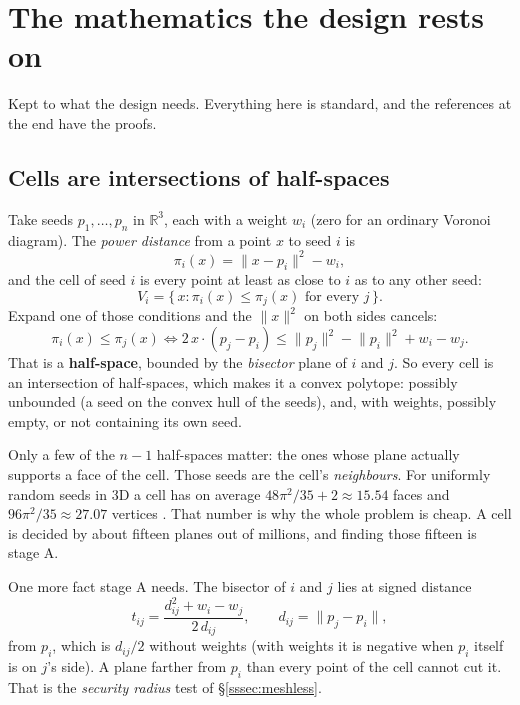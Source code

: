 \documentclass[11pt,a4paper]{article}
\newcommand{\R}{\mathbb{R}}
\newcommand{\norm}[1]{\lVert #1\rVert}
\newcommand{\secref}[1]{\S\ref{#1}}
\begin{document}
\section{The mathematics the design rests on}\label{sec:math}

Kept to what the design needs. Everything here is standard, and the references at the end have
the proofs.

\subsection{Cells are intersections of half-spaces}\label{ssec:halfspaces}

Take seeds $p_1,\dots,p_n$ in $\R^3$, each with a weight $w_i$ (zero for an ordinary Voronoi
diagram). The \emph{power distance} from a point $x$ to seed $i$ is
\[
  \pi_i(x) = \norm{x - p_i}^2 - w_i ,
\]
and the cell of seed $i$ is every point at least as close to $i$ as to any other seed:
\[
  V_i = \{\, x : \pi_i(x) \le \pi_j(x) \text{ for every } j \,\}.
\]
Expand one of those conditions and the $\norm{x}^2$ on both sides cancels:
\[
  \pi_i(x) \le \pi_j(x) \iff 2\,x\cdot(p_j - p_i) \le \norm{p_j}^2 - \norm{p_i}^2 + w_i - w_j .
\]
That is a \textbf{half-space}, bounded by the \emph{bisector} plane of $i$ and $j$. So every
cell is an intersection of half-spaces, which makes it a convex polytope: possibly unbounded (a
seed on the convex hull of the seeds), and, with weights, possibly empty, or not containing its
own seed.

Only a few of the $n-1$ half-spaces matter: the ones whose plane actually supports a face of
the cell. Those seeds are the cell's \emph{neighbours}. For uniformly random seeds in 3D a cell
has on average $48\pi^2/35 + 2 \approx 15.54$ faces and $96\pi^2/35 \approx 27.07$ vertices
\citep{meijering1953}. That number is why the whole problem is cheap. A cell is decided by
about fifteen planes out of millions, and finding those fifteen is stage A.

One more fact stage A needs. The bisector of $i$ and $j$ lies at signed distance
\[
  t_{ij} = \frac{d_{ij}^2 + w_i - w_j}{2\,d_{ij}}, \qquad d_{ij} = \norm{p_j - p_i},
\]
from $p_i$, which is $d_{ij}/2$ without weights (with weights it is negative when $p_i$ itself is
on $j$'s side). A plane farther from $p_i$ than every point of the cell cannot cut it. That is
the \emph{security radius} test of \secref{sssec:meshless}.
\end{document}
